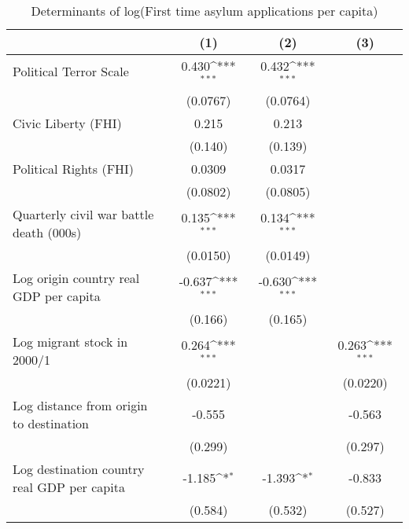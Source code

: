 \begin{table}[htbp]\centering
\def\sym#1{\ifmmode^{#1}\else\(^{#1}\)\fi}
\caption{Determinants of log(First time asylum applications per capita)}
\begin{tabular}{l*{3}{c}}
\hline\hline
                    &\multicolumn{1}{c}{(1)}         &\multicolumn{1}{c}{(2)}         &\multicolumn{1}{c}{(3)}         \\
\hline
Political Terror Scale&       0.430\sym{***}&       0.432\sym{***}&                     \\
                    &    (0.0767)         &    (0.0764)         &                     \\
[1em]
Civic Liberty (FHI) &       0.215         &       0.213         &                     \\
                    &     (0.140)         &     (0.139)         &                     \\
[1em]
Political Rights (FHI)&      0.0309         &      0.0317         &                     \\
                    &    (0.0802)         &    (0.0805)         &                     \\
[1em]
Quarterly civil war battle death (000s)&       0.135\sym{***}&       0.134\sym{***}&                     \\
                    &    (0.0150)         &    (0.0149)         &                     \\
[1em]
Log origin country real GDP per capita&      -0.637\sym{***}&      -0.630\sym{***}&                     \\
                    &     (0.166)         &     (0.165)         &                     \\
[1em]
Log migrant stock in 2000/1&       0.264\sym{***}&                     &       0.263\sym{***}\\
                    &    (0.0221)         &                     &    (0.0220)         \\
[1em]
Log distance from origin to destination&      -0.555         &                     &      -0.563         \\
                    &     (0.299)         &                     &     (0.297)         \\
[1em]
Log destination country real GDP per capita&      -1.185\sym{*}  &      -1.393\sym{*}  &      -0.833         \\
                    &     (0.584)         &     (0.532)         &     (0.527)         \\

\end{tabular}
\end{table}

